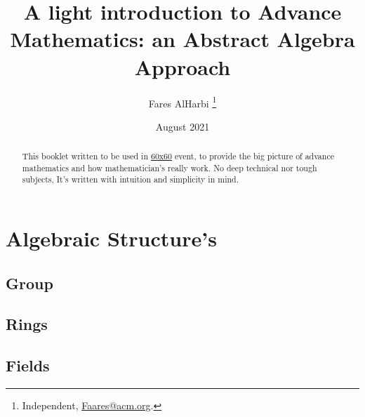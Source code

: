 \documentclass{article}
\title{A light introduction to Advance Mathematics: an Abstract Algebra Approach}
\author{Fares AlHarbi \thanks{Independent, \href{mailto:faares@acm.org}{Faares@acm.org}.}}
\date{August 2021}
\begin{document}
\maketitle
\begin{abstract}
    This booklet written to be used in \hyperlink{https://salla.sa/durba/RYePmz}{60x60} event,
    to provide the big picture of advance mathematics and how mathematician's really work.
    No deep technical nor tough subjects, It's written with intuition and simplicity in mind. 
\end{abstract}

\clearpage
\tableofcontents 






\clearpage




\section{Algebraic Structure's}

\subsection{Group}

\subsection{Rings}

\subsection{Fields}

\clearpage
\printbibliography[heading=bibintoc]
\end{document}
